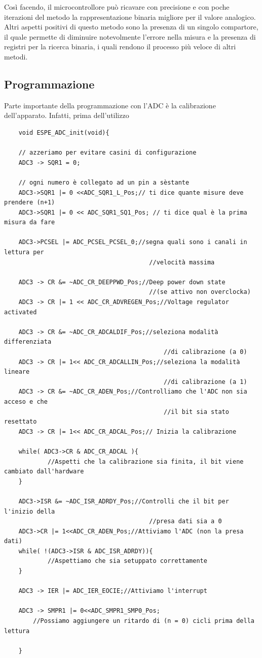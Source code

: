 Così facendo, il microcontrollore può ricavare con precisione e con poche iterazioni del metodo la rappresentazione binaria migliore per il valore analogico.\\

Altri aspetti positivi di questo metodo sono la presenza di un singolo compartore, il quale permette di diminuire notevolmente l'errore nella misura e la presenza di registri per la ricerca binaria, i quali rendono il processo più veloce di altri metodi.\\

\subsection{Programmazione}
Parte importante della programmazione con l'ADC è la calibrazione dell'apparato. Infatti, prima dell'utilizzo

\noindent
\begin{verbatim}
    void ESPE_ADC_init(void){

	// azzeriamo per evitare casini di configurazione
	ADC3 -> SQR1 = 0;

	// ogni numero è collegato ad un pin a sèstante
	ADC3->SQR1 |= 0 <<ADC_SQR1_L_Pos;// ti dice quante misure deve prendere (n+1)
	ADC3->SQR1 |= 0 << ADC_SQR1_SQ1_Pos; // ti dice qual è la prima misura da fare

	ADC3->PCSEL |= ADC_PCSEL_PCSEL_0;//segna quali sono i canali in lettura per
                                        //velocità massima

	ADC3 -> CR &= ~ADC_CR_DEEPPWD_Pos;//Deep power down state
                                        //(se attivo non overclocka)
	ADC3 -> CR |= 1 << ADC_CR_ADVREGEN_Pos;//Voltage regulator activated

	ADC3 -> CR &= ~ADC_CR_ADCALDIF_Pos;//seleziona modalità differenziata
                                            //di calibrazione (a 0)
	ADC3 -> CR |= 1<< ADC_CR_ADCALLIN_Pos;//seleziona la modalità lineare
                                            //di calibrazione (a 1)
	ADC3 -> CR &= ~ADC_CR_ADEN_Pos;//Controlliamo che l'ADC non sia acceso e che
                                            //il bit sia stato resettato
	ADC3 -> CR |= 1<< ADC_CR_ADCAL_Pos;// Inizia la calibrazione

	while( ADC3->CR & ADC_CR_ADCAL ){							
            //Aspetti che la calibrazione sia finita, il bit viene cambiato dall'hardware
	}

	ADC3->ISR &= ~ADC_ISR_ADRDY_Pos;//Controlli che il bit per l'inizio della
                                        //presa dati sia a 0
	ADC3->CR |= 1<<ADC_CR_ADEN_Pos;//Attiviamo l'ADC (non la presa dati)
	while( !(ADC3->ISR & ADC_ISR_ADRDY)){						
            //Aspettiamo che sia setuppato correttamente
	}

	ADC3 -> IER |= ADC_IER_EOCIE;//Attiviamo l'interrupt

	ADC3 -> SMPR1 |= 0<<ADC_SMPR1_SMP0_Pos;
        //Possiamo aggiungere un ritardo di (n = 0) cicli prima della lettura

    }
\end{verbatim}
\label{code:ADC_init}

